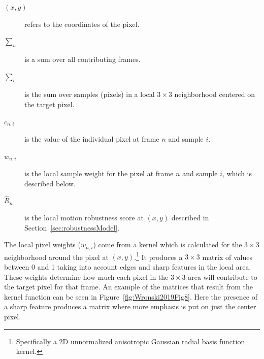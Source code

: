 \documentclass{sig-alternate}
\begin{document}
\begin{description}
  \item[$(x,y)$] refers to the coordinates of the pixel. 
  \item[$\sum_{n}$] is a sum over all contributing frames.
  \item[$\sum_{i}$] is the sum over samples (pixels) in a local $3\times 3$ neighborhood centered on the target pixel.
  \item[$c_{n, i}$] is the value of the individual pixel at frame $n$ and sample $i$.
  \item[$w_{n, i}$] is the local sample weight for the pixel at frame $n$ and sample $i$, which is described below. 
  \item[$\hat{R}_{n}$] is the local motion robustness score at $(x,y)$ described in Section~\ref{sec:robustnessModel}.
\end{description}





The local pixel weights ($w_{n, i}$) come from a kernel which is calculated for the $3\times 3$ neighborhood around the pixel at $(x,y)$.\footnote{Specifically a 2D unnormalized anisotropic Gaussian radial basis function kernel.} It produces a $3\times 3$ matrix of values between 0 and 1 taking into account edges and sharp features in the local area. These weights determine how much each pixel in the $3\times 3$ area will contribute to the target pixel for that frame. An example of the matrices that result from the kernel function can be seen in Figure~\ref{fig:Wronski2019Fig8}. Here the presence of a sharp feature produces a matrix where more emphasis is put on just the center pixel.

\end{document}

